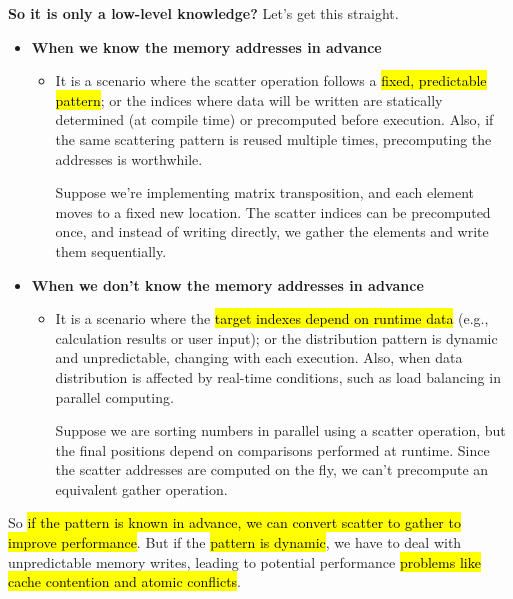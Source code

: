 \highspace
\textcolor{Green3}{ \textbf{So it is only a low-level knowledge?}} Let's get this straight.
\begin{itemize}
    \item[\textcolor{Green3}{\faIcon{check}}] \textcolor{Green3}{\textbf{When we know the memory addresses in advance}}
    \begin{itemize}
        \item It is a scenario where the scatter operation follows a \hl{fixed, predictable pattern}; or the indices where data will be written are statically determined (at compile time) or precomputed before execution. Also, if the same scattering pattern is reused multiple times, precomputing the addresses is worthwhile.

        \begin{examplebox}
            Suppose we're implementing matrix transposition, and each element moves to a fixed new location. The scatter indices can be precomputed once, and instead of writing directly, we gather the elements and write them sequentially.
        \end{examplebox}
    \end{itemize}

    \item[\textcolor{Red2}{\faIcon{times}}] \textcolor{Red2}{\textbf{When we don't know the memory addresses in advance}}
    \begin{itemize}
        \item It is a scenario where the \hl{target indexes depend on runtime data} (e.g., calculation results or user input); or the distribution pattern is dynamic and unpredictable, changing with each execution. Also, when data distribution is affected by real-time conditions, such as load balancing in parallel computing.
    
        \begin{examplebox}
            Suppose we are sorting numbers in parallel using a scatter operation, but the final positions depend on comparisons performed at runtime. Since the scatter addresses are computed on the fly, we can't precompute an equivalent gather operation.
        \end{examplebox}
    \end{itemize}
\end{itemize}
So \hl{if the pattern is known in advance, we can convert scatter to gather to improve performance}. But if the \hl{pattern is dynamic}, we have to deal with unpredictable memory writes, leading to potential performance \hl{problems like cache contention and atomic conflicts}.